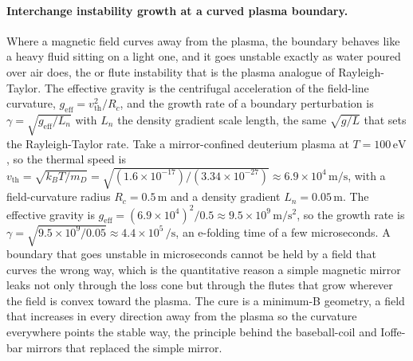 \paragraph{Interchange instability growth at a curved plasma boundary.}
Where a magnetic field curves away from the plasma, the boundary behaves like
a heavy fluid sitting on a light one, and it goes unstable exactly as water
poured over air does, the  or flute instability that is
the plasma analogue of Rayleigh-Taylor. The effective gravity is the
centrifugal acceleration of the field-line curvature, $g_{\mathrm{eff}} =
v_{\mathrm{th}}^{2}/R_c$, and the growth rate of a boundary perturbation is
$\gamma = \sqrt{g_{\mathrm{eff}}/L_n}$ with $L_n$ the density gradient scale
length, the same $\sqrt{g/L}$ that sets the Rayleigh-Taylor rate. Take a
mirror-confined deuterium plasma at $T = 100\,\si{\electronvolt}$, so the
thermal speed is $v_{\mathrm{th}} = \sqrt{k_B T/m_D} = \sqrt{(1.6\times
10^{-17})/(3.34\times 10^{-27})} \approx 6.9\times 10^{4}\,\si{\meter\per
\second}$, with a field-curvature radius $R_c = 0.5\,\si{\meter}$ and a
density gradient $L_n = 0.05\,\si{\meter}$. The effective gravity is
$g_{\mathrm{eff}} = (6.9\times 10^{4})^{2}/0.5 \approx 9.5\times 10^{9}\,\si{
\meter\per\second\squared}$, so the growth rate is $\gamma = \sqrt{9.5\times
10^{9}/0.05} \approx 4.4\times 10^{5}\,\si{\per\second}$, an e-folding time of
a few microseconds. A boundary that goes unstable in microseconds cannot be
held by a field that curves the wrong way, which is the quantitative reason a
simple magnetic mirror leaks not only through the loss cone but through the
flutes that grow wherever the field is convex toward the plasma. The cure is a
minimum-B geometry, a field that increases in every direction away from the
plasma so the curvature everywhere points the stable way, the principle behind
the baseball-coil and Ioffe-bar mirrors that replaced the simple mirror.

